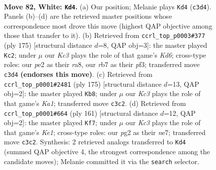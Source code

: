 \documentclass[11pt]{article}
\begin{document}
\clearpage

\begin{figure}[p]\centering
\begin{subfigure}{0.46\textwidth}\centering
\resizebox{\linewidth}{!}{%
\newchessgame
\chessboard[
  setfen={8/1r6/6k1/8/8/2K5/4p1p1/5q2 w - - 0 82},
  showmover=false,
  pgfstyle=straightmove, color=movearrow, markmove={c3-d4}
]}
\caption{}
\end{subfigure}\hfill
\begin{subfigure}{0.46\textwidth}\centering
\resizebox{\linewidth}{!}{%
\newchessgame
\chessboard[
  setfen={R6Q/6P1/8/8/8/3k1P2/6K1/8 b - - 0 88},
  showmover=false,
  pgfstyle=straightmove, color=movearrow, markmove={d3-c2}
]}
\caption{}
\end{subfigure}
\\[4pt]
\begin{subfigure}{0.46\textwidth}\centering
\resizebox{\linewidth}{!}{%
\newchessgame
\chessboard[
  setfen={k5K1/3Q4/4P3/8/8/8/8/8 b - - 0 88},
  showmover=false,
  pgfstyle=straightmove, color=movearrow, markmove={a8-b8}
]}
\caption{}
\end{subfigure}\hfill
\begin{subfigure}{0.46\textwidth}\centering
\resizebox{\linewidth}{!}{%
\newchessgame
\chessboard[
  setfen={4k3/4N3/3Q4/2P5/8/2K5/6R1/8 b - - 0 81},
  showmover=false,
  pgfstyle=straightmove, color=movearrow, markmove={e8-f7}
]}
\caption{}
\end{subfigure}
\caption{\textbf{Move 82, White: \texttt{Kd4}.} (a) Our position; Melanie plays \texttt{Kd4} (\texttt{c3d4}). Panels (b)--(d) are the retrieved master positions whose correspondence most drove this move (highest QAP objective among those that transfer to it). (b) Retrieved from \texttt{ccrl\_top\_p0003\#377} (ply 175) [structural distance $d$=8, QAP obj=3]: the master played \texttt{Kc2}; under $\mu$ our \emph{Kc3} plays the role of that game's \emph{Kd6}; cross-type roles: our \emph{p}e2 as their \emph{r}a8, our \emph{r}b7 as their \emph{p}f3; transferred move \texttt{c3d4} \textbf{(endorses this move)}. (c) Retrieved from \texttt{ccrl\_top\_p0001\#2481} (ply 175) [structural distance $d$=13, QAP obj=2]: the master played \texttt{Kb8}; under $\mu$ our \emph{Kc3} plays the role of that game's \emph{Ka1}; transferred move \texttt{c3c2}. (d) Retrieved from \texttt{ccrl\_top\_p0001\#664} (ply 161) [structural distance $d$=12, QAP obj=2]: the master played \texttt{Kf7}; under $\mu$ our \emph{Kc3} plays the role of that game's \emph{Ke1}; cross-type roles: our \emph{p}g2 as their \emph{n}e7; transferred move \texttt{c3c2}. Synthesis: 2 retrieved analogs transferred to \texttt{Kd4} (summed QAP objective 4, the strongest correspondence among the candidate moves); Melanie committed it via the \texttt{search} selector.}
\label{fig:thought-m162}
\end{figure}
\end{document}
